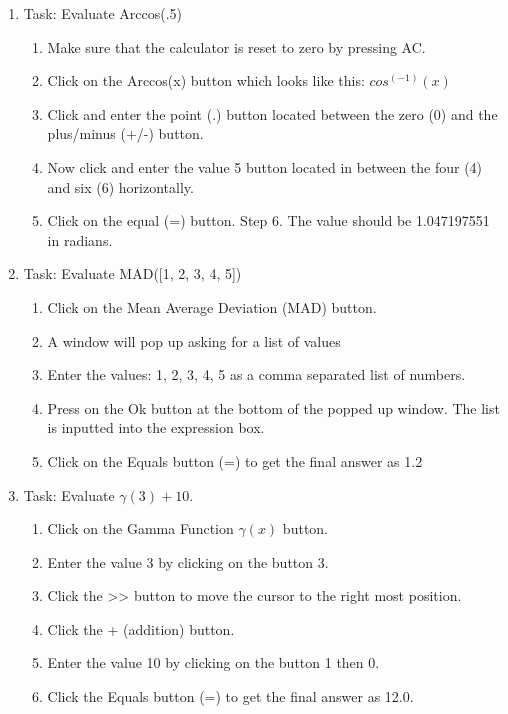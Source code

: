 \begin{enumerate}
            \item Task: Evaluate Arccos(.5)
                \begin{enumerate}
                    \item Make sure that the calculator is reset to zero by pressing AC.
                	\item Click on the Arccos(x) button which looks like this: $cos^(-1)(x)$
                    \item Click and enter the point (.) button located between the zero (0) and the plus/minus (+/-) button.
                    \item Now click and enter the value 5 button located in between the four (4) and six (6) horizontally.
                    \item Click on the equal (=) button.
                    Step 6. The value should be 1.047197551 in radians.
                \end{enumerate}


            \item Task: Evaluate MAD([1, 2, 3, 4, 5])
                \begin{enumerate}
                    \item Click on the Mean Average Deviation (MAD) button.
                    \item A window will pop up asking for a list of values
                    \item Enter the values: 1, 2, 3, 4, 5 as a comma separated list of numbers.
                    \item Press on the Ok button at the bottom of the popped up window. The list is inputted into the expression box.
                    \item Click on the Equals button (=) to get the final answer as 1.2
                \end{enumerate}

            \item Task: Evaluate $\gamma(3)+10$.
                \begin{enumerate}
                	\item Click on the Gamma Function $\gamma(x)$ button.
                	\item Enter the value 3 by clicking on the button 3.
                	\item Click the >> button to move the cursor to the right most position.
                	\item Click the + (addition) button.
                	\item Enter the value 10 by clicking on the button 1 then 0.
                	\item Click the Equals button (=) to get the final answer as 12.0.
                \end{enumerate}
        \end{enumerate}
